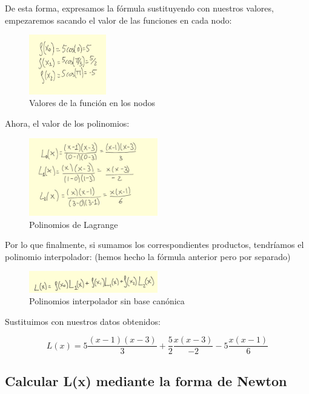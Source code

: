 \documentclass{article}
\begin{document}
De esta forma, expresamos la fórmula sustituyendo con nuestros valores, empezaremos sacando el valor de las funciones en cada nodo:

\begin{figure}[h]
  \center
  \includegraphics[width=0.3\textwidth]{src/lagrangefis.jpg}
  \caption{Valores de la función en los nodos}
\end{figure} 
  
Ahora, el valor de los polinomios:

\begin{figure}[h]
  \center
  \includegraphics[width=0.5\textwidth]{src/lagrangelis.jpg}
  \caption{Polinomios de Lagrange}
\end{figure}

Por lo que finalmente, si sumamos los correspondientes productos, tendríamos el polinomio interpolador: (hemos hecho la fórmula anterior pero por separado)

\begin{figure}[h]
  \center
  \includegraphics[width=0.5\textwidth]{src/lagrangelx.jpg}
  \caption{Polinomios interpolador sin base canónica}
\end{figure}

Sustituimos con nuestros datos obtenidos:

\begin{equation}
  L(x) = 5 \frac{(x - 1)(x - 3)}{3} + \frac{5}{2} \frac{x(x - 3)}{-2} - 5 \frac{x(x - 1)}{6}
\end{equation}

\subsection{Calcular L(x) mediante la forma de Newton}
\end{document}

